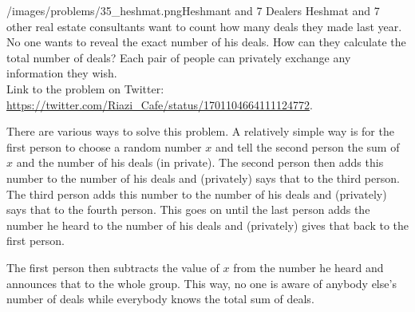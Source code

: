 \begin{problem}{/images/problems/35_heshmat.png}{Heshmant and 7 Dealers}
Heshmat and 7 other real estate consultants want to count how many deals they made last year. No one wants to reveal the exact number of his deals. How can they calculate the total number of deals? Each pair of people can privately exchange any information they wish.\\[0.2cm]

Link to the problem on Twitter: \url{https://twitter.com/Riazi_Cafe/status/1701104664111124772}.
\end{problem}
\begin{solution}
There are various ways to solve this problem.
A relatively simple way is for the first person to choose a random number $x$ and tell the second person the sum of $x$ and the number of his deals (in private). The second person then adds this number to the number of his deals and (privately) says that to the third person. The third person adds this number to the number of his deals and (privately) says that to the fourth person. This goes on until the last person adds the number he heard to the number of his deals and (privately) gives that back to the first person.

The first person then subtracts the value of $x$ from the number he heard and announces that to the whole group. This way, no one is aware of anybody else's number of deals while everybody knows the total sum of deals.
\end{solution}
